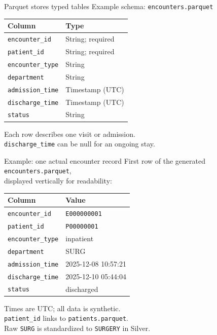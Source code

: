 \documentclass{beamer}
\begin{document}
\begin{frame}{Parquet stores typed tables}
  Example schema: \texttt{encounters.parquet}\par
  \medskip
  \begin{tabular}{ll}
    \toprule
    \textbf{Column} & \textbf{Type} \\
    \midrule
    \texttt{encounter\_id} & String; required \\
    \texttt{patient\_id} & String; required \\
    \texttt{encounter\_type} & String \\
    \texttt{department} & String \\
    \texttt{admission\_time} & Timestamp (UTC) \\
    \texttt{discharge\_time} & Timestamp (UTC) \\
    \texttt{status} & String \\
    \bottomrule
  \end{tabular}\par
  \medskip
  Each row describes one visit or admission.\\
  \texttt{discharge\_time} can be null for an ongoing stay.
\end{frame}

\begin{frame}{Example: one actual encounter record}
  First row of the generated \texttt{encounters.parquet},\\
  displayed vertically for readability:\par
  \medskip
  \begin{tabular}{ll}
    \toprule
    \textbf{Column} & \textbf{Value} \\
    \midrule
    \texttt{encounter\_id} & \texttt{E000000001} \\
    \texttt{patient\_id} & \texttt{P00000001} \\
    \texttt{encounter\_type} & inpatient \\
    \texttt{department} & SURG \\
    \texttt{admission\_time} & 2025-12-08 10:57:21 \\
    \texttt{discharge\_time} & 2025-12-10 05:44:04 \\
    \texttt{status} & discharged \\
    \bottomrule
  \end{tabular}\par
  \medskip
  \small Times are UTC; all data is synthetic.\\
  \texttt{patient\_id} links to \texttt{patients.parquet}.\\
  Raw \texttt{SURG} is standardized to \texttt{SURGERY} in Silver.
\end{frame}
\end{document}
